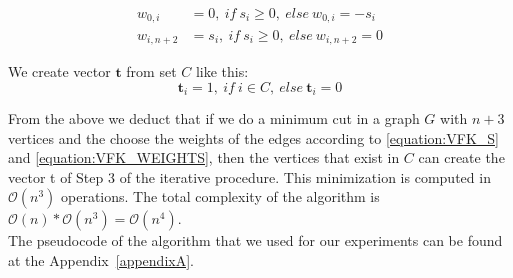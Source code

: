 \documentclass{amsart}
\numberwithin{equation}{section}
\begin{document}
{\begin{equation}
\begin{split}
w_{0,i} & = 0, \ if \ s_i \geq 0, \ else \ w_{0,i} = - s_i \\
w_{i,n+2} & = s_i, \ if \ s_i \geq 0, \ else \  w_{i,n+2} = 0
\end{split}
\label{equation:VFK_WEIGHTS}
\end{equation}

We create vector $\textbf{t}$ from set $C$ like this:
\begin{equation}
\textbf{t}_i = 1, \ if \ i \in C, \ else \  \textbf{t}_i = 0
\label{equation:VFK_WEIGHTS}
\end{equation}

From the above we deduct that if we do a minimum cut in a graph $G$ with $n+3$ vertices and the choose the weights of the edges according to \eqref{equation:VFK_S} and \eqref{equation:VFK_WEIGHTS}, then the vertices that exist in $C$ can create the vector t of Step 3 of the iterative procedure. This minimization is computed in $\mathcal{O}(n^3)$ operations. The total complexity of the algorithm is  $\mathcal{O}(n)*\mathcal{O}(n^3)=\mathcal{O}(n^4)$. \\

The pseudocode of the algorithm that we used for our experiments can be found at the Appendix~\ref{appendixA}.


}
\end{document}
